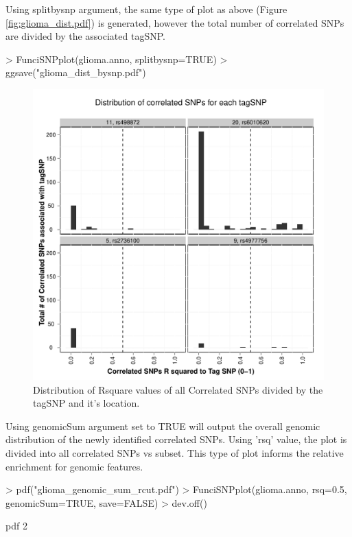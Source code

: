 \documentclass[a4paper]{article}
\begin{document}
Using splitbysnp argument, the same type of plot as above (Figure 
        \ref{fig:glioma_dist.pdf}) is generated, however the total number of 
correlated SNPs are divided by the associated tagSNP.
\begin{Schunk}
\begin{Sinput}
> FunciSNPplot(glioma.anno, splitbysnp=TRUE)
> ggsave("glioma_dist_bysnp.pdf")
\end{Sinput}
\end{Schunk}
\begin{figure}[ht!]
\begin{center}
\includegraphics{glioma_dist_bysnp.pdf}
\caption{\label{fig:glioma_dist_bysnp.pdf} Distribution of Rsquare values of all
 Correlated SNPs divided by the tagSNP and it's location.}
{\footnotesize{}}
\end{center}
\end{figure}
Using genomicSum argument set to TRUE will output the overall genomic 
distribution of the newly identified correlated SNPs.  Using 'rsq' value, the 
plot is divided into all correlated SNPs vs subset. This type of plot informs the 
relative enrichment for genomic features.
\begin{Schunk}
\begin{Sinput}
> pdf("glioma_genomic_sum_rcut.pdf")
> FunciSNPplot(glioma.anno, rsq=0.5, genomicSum=TRUE, save=FALSE)
> dev.off()
\end{Sinput}
\begin{Soutput}
pdf 
  2 
\end{Soutput}
\end{Schunk}
\end{document}
